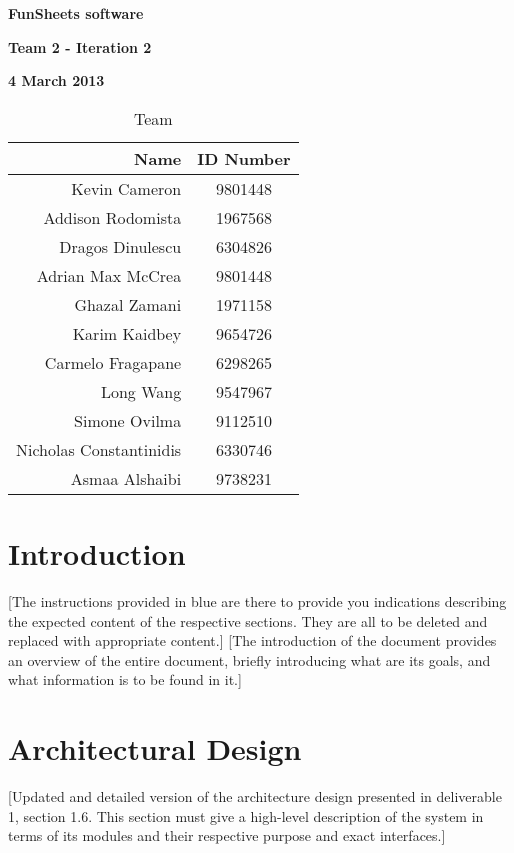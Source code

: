 \documentclass[12pt]{article}
\begin{document}
\vspace*{0.5in}
\centerline{\bf\Large FunSheets software}

\vspace*{0.5in}
\centerline{\bf\Large Team 2 - Iteration 2}

\vspace*{0.5in}
\centerline{\bf\Large 4 March 2013}

\vspace*{1.5in}
\begin{table}[htbp]
\caption{Team}
\begin{center}
\begin{tabular}{|r | c|}
\hline
Name & ID Number \\\hline\hline
Kevin Cameron & 9801448 \\\hline\hline
Addison Rodomista & 1967568 \\\hline\hline
Dragos Dinulescu & 6304826 \\\hline\hline
Adrian Max McCrea & 9801448 \\\hline\hline
Ghazal Zamani & 1971158 \\\hline\hline
Karim Kaidbey & 9654726 \\\hline\hline
Carmelo Fragapane & 6298265 \\\hline\hline
Long Wang & 9547967 \\\hline\hline
Simone Ovilma & 9112510 \\\hline\hline
Nicholas Constantinidis & 6330746 \\\hline\hline
Asmaa Alshaibi & 9738231 \\\hline
\end{tabular}
\end{center}
\end{table}

\clearpage

\section{Introduction}
[The instructions provided in blue are there to provide you indications describing the expected content of the respective sections. They are all to be deleted and replaced with appropriate content.]
[The introduction of the document provides an overview of the entire document, briefly introducing what are its goals, and what information is to be found in it.]

\section{Architectural Design}
[Updated and detailed version of the architecture design presented in deliverable 1, section 1.6. This section must give a high-level description of the system in terms of its modules and their respective purpose and exact interfaces.]
\end{document}
